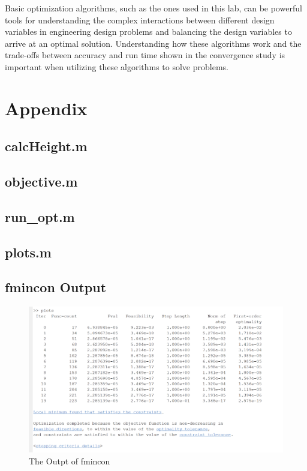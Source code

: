 \documentclass[11pt]{article}%
\begin{document}
 Basic optimization algorithms, such as the ones used in this lab, can be powerful tools for understanding the complex interactions between different design variables in engineering design problems and balancing the design variables to arrive at an optimal solution. Understanding how these algorithms work and the trade-offs between accuracy and run time shown in the convergence study is important when utilizing these algorithms to solve problems. 

\printbibliography
\newpage
\section{Appendix}

\subsection{calcHeight.m}
\label{sec:calcHeight}

\newpage
\subsection{objective.m}
\label{sec:objective}

\newpage
\subsection{run\_opt.m}
\label{sec:runOpt}

\newpage
\subsection{plots.m}
\label{sec:plots}

\subsection{fmincon Output}
\label{sec:fincon}
\begin{figure}[h!]
    \centering
    \includegraphics[width=0.75\linewidth]{fminconoutput.png}
    \caption{ The Outpt of fmincon }
    \label{fig:fmincon}
\end{figure}
\end{document}
